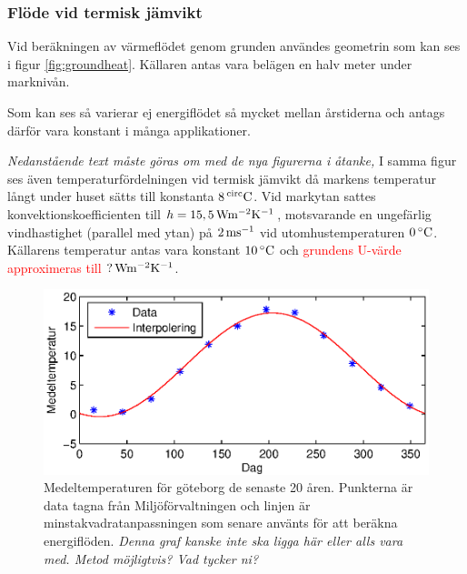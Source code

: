 \subsubsection{Flöde vid termisk jämvikt}

Vid beräkningen av värmeflödet genom grunden användes geometrin som kan ses i figur \ref{fig:groundheat}.
Källaren antas vara belägen en halv meter under marknivån.

Som kan ses så varierar ej energiflödet så mycket mellan årstiderna och antags därför vara konstant i många applikationer.


\emph{\color{red} Nedanstående text måste göras om med de nya figurerna i åtanke,}
I samma figur ses även temperaturfördelningen vid termisk jämvikt då markens temperatur långt under huset sätts till konstanta $\unit[8]{^{circ}C}$. Vid markytan sattes konvektionskoefficienten till $h=\unit[15,5]{Wm^{-2}K^{-1}}$, motsvarande en ungefärlig vindhastighet (parallel med ytan) på $\unit[2]{ms^{-1}}$ vid utomhustemperaturen $\unit[0]{^{\circ}C}$. Källarens temperatur antas vara konstant $\unit[10]{^{\circ}C}$ och \textcolor{red}{grundens U-värde approximeras till $\unit[?]{Wm^{-2}K^{-1}}$}.


\begin{figure}
\centering
\includegraphics{images/meantemperature.eps}
\caption{Medeltemperaturen för göteborg de senaste 20 åren. Punkterna är data tagna från Miljöförvaltningen
och linjen är minstakvadratanpassningen som senare använts för att beräkna energiflöden.
\emph{\color{red} Denna graf kanske inte ska ligga här eller alls vara med. Metod möjligtvis? Vad tycker ni?}}
\end{figure}

